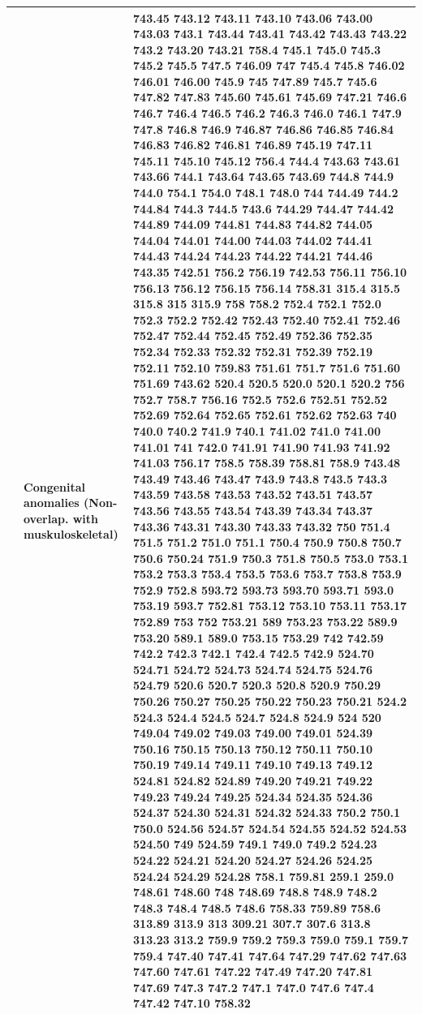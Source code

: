 \documentclass[3p,super,numbers,sort&compress,preprint,10pt]{elsarticle}
\begin{document}
\begin{longtable}{|L{.1in}|L{.6in}||L{5.65in}|}
    & Congenital  anomalies (Non-overlap. with muskuloskeletal)  &  743.45 743.12 743.11 743.10 743.06 743.00 743.03 743.1 743.44 743.41 743.42 743.43 743.22 743.2 743.20 743.21 758.4 745.1 745.0 745.3 745.2 745.5 747.5 746.09 747 745.4 745.8 746.02 746.01 746.00 745.9 745 747.89 745.7 745.6 747.82 747.83 745.60 745.61 745.69 747.21 746.6 746.7 746.4 746.5 746.2 746.3 746.0 746.1 747.9 747.8 746.8 746.9 746.87 746.86 746.85 746.84 746.83 746.82 746.81 746.89 745.19 747.11 745.11 745.10 745.12 756.4 744.4 743.63 743.61 743.66 744.1 743.64 743.65 743.69 744.8 744.9 744.0 754.1 754.0 748.1 748.0 744 744.49 744.2 744.84 744.3 744.5 743.6 744.29 744.47 744.42 744.89 744.09 744.81 744.83 744.82 744.05 744.04 744.01 744.00 744.03 744.02 744.41 744.43 744.24 744.23 744.22 744.21 744.46 743.35 742.51 756.2 756.19 742.53 756.11 756.10 756.13 756.12 756.15 756.14 758.31 315.4 315.5 315.8 315 315.9 758 758.2 752.4 752.1 752.0 752.3 752.2 752.42 752.43 752.40 752.41 752.46 752.47 752.44 752.45 752.49 752.36 752.35 752.34 752.33 752.32 752.31 752.39 752.19 752.11 752.10 759.83 751.61 751.7 751.6 751.60 751.69 743.62 520.4 520.5 520.0 520.1 520.2 756 752.7 758.7 756.16 752.5 752.6 752.51 752.52 752.69 752.64 752.65 752.61 752.62 752.63 740 740.0 740.2 741.9 740.1 741.02 741.0 741.00 741.01 741 742.0 741.91 741.90 741.93 741.92 741.03 756.17 758.5 758.39 758.81 758.9 743.48 743.49 743.46 743.47 743.9 743.8 743.5 743.3 743.59 743.58 743.53 743.52 743.51 743.57 743.56 743.55 743.54 743.39 743.34 743.37 743.36 743.31 743.30 743.33 743.32 750 751.4 751.5 751.2 751.0 751.1 750.4 750.9 750.8 750.7 750.6 750.24 751.9 750.3 751.8 750.5 753.0 753.1 753.2 753.3 753.4 753.5 753.6 753.7 753.8 753.9 752.9 752.8 593.72 593.73 593.70 593.71 593.0 753.19 593.7 752.81 753.12 753.10 753.11 753.17 752.89 753 752 753.21 589 753.23 753.22 589.9 753.20 589.1 589.0 753.15 753.29 742 742.59 742.2 742.3 742.1 742.4 742.5 742.9 524.70 524.71 524.72 524.73 524.74 524.75 524.76 524.79 520.6 520.7 520.3 520.8 520.9 750.29 750.26 750.27 750.25 750.22 750.23 750.21 524.2 524.3 524.4 524.5 524.7 524.8 524.9 524 520 749.04 749.02 749.03 749.00 749.01 524.39 750.16 750.15 750.13 750.12 750.11 750.10 750.19 749.14 749.11 749.10 749.13 749.12 524.81 524.82 524.89 749.20 749.21 749.22 749.23 749.24 749.25 524.34 524.35 524.36 524.37 524.30 524.31 524.32 524.33 750.2 750.1 750.0 524.56 524.57 524.54 524.55 524.52 524.53 524.50 749 524.59 749.1 749.0 749.2 524.23 524.22 524.21 524.20 524.27 524.26 524.25 524.24 524.29 524.28 758.1 759.81 259.1 259.0 748.61 748.60 748 748.69 748.8 748.9 748.2 748.3 748.4 748.5 748.6 758.33 759.89 758.6 313.89 313.9 313 309.21 307.7 307.6 313.8 313.23 313.2 759.9 759.2 759.3 759.0 759.1 759.7 759.4 747.40 747.41 747.64 747.29 747.62 747.63 747.60 747.61 747.22 747.49 747.20 747.81 747.69 747.3 747.2 747.1 747.0 747.6 747.4 747.42 747.10 758.32\\\hline

\end{longtable}
\end{document}
